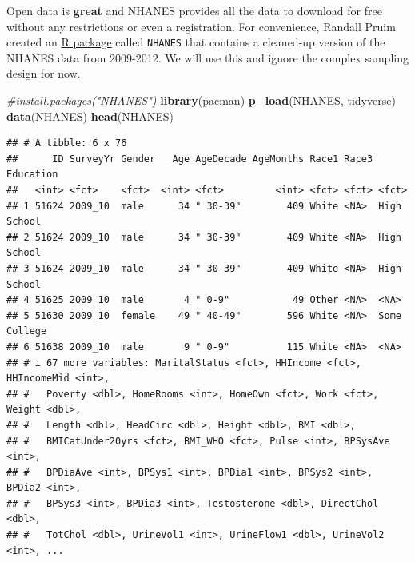 \documentclass[
]{book}
\newenvironment{Shaded}{\begin{snugshade}}{\end{snugshade}}
\newcommand{\CommentTok}[1]{\textcolor[rgb]{0.56,0.35,0.01}{\textit{#1}}}
\newcommand{\FunctionTok}[1]{\textcolor[rgb]{0.13,0.29,0.53}{\textbf{#1}}}
\newcommand{\NormalTok}[1]{#1}
\newcommand{\SpecialCharTok}[1]{\textcolor[rgb]{0.81,0.36,0.00}{\textbf{#1}}}
\begin{document}
Open data is \textbf{great} and NHANES provides all the data to download for free
without any restrictions or even a registration. For convenience, Randall Pruim
created an \href{https://cran.r-project.org/web/packages/NHANES/NHANES.pdf}{R package}
called \texttt{NHANES} that contains a cleaned-up version of the
NHANES data from 2009-2012. We will use this and ignore the complex sampling
design for now.

\begin{Shaded}
\begin{Highlighting}[]
\CommentTok{\#install.packages("NHANES")}
\FunctionTok{library}\NormalTok{(pacman)}
\FunctionTok{p\_load}\NormalTok{(NHANES, tidyverse)}
\FunctionTok{data}\NormalTok{(NHANES)}
\FunctionTok{head}\NormalTok{(NHANES)}
\end{Highlighting}
\end{Shaded}

\begin{verbatim}
## # A tibble: 6 x 76
##      ID SurveyYr Gender   Age AgeDecade AgeMonths Race1 Race3 Education   
##   <int> <fct>    <fct>  <int> <fct>         <int> <fct> <fct> <fct>       
## 1 51624 2009_10  male      34 " 30-39"        409 White <NA>  High School 
## 2 51624 2009_10  male      34 " 30-39"        409 White <NA>  High School 
## 3 51624 2009_10  male      34 " 30-39"        409 White <NA>  High School 
## 4 51625 2009_10  male       4 " 0-9"           49 Other <NA>  <NA>        
## 5 51630 2009_10  female    49 " 40-49"        596 White <NA>  Some College
## 6 51638 2009_10  male       9 " 0-9"          115 White <NA>  <NA>        
## # i 67 more variables: MaritalStatus <fct>, HHIncome <fct>, HHIncomeMid <int>,
## #   Poverty <dbl>, HomeRooms <int>, HomeOwn <fct>, Work <fct>, Weight <dbl>,
## #   Length <dbl>, HeadCirc <dbl>, Height <dbl>, BMI <dbl>,
## #   BMICatUnder20yrs <fct>, BMI_WHO <fct>, Pulse <int>, BPSysAve <int>,
## #   BPDiaAve <int>, BPSys1 <int>, BPDia1 <int>, BPSys2 <int>, BPDia2 <int>,
## #   BPSys3 <int>, BPDia3 <int>, Testosterone <dbl>, DirectChol <dbl>,
## #   TotChol <dbl>, UrineVol1 <int>, UrineFlow1 <dbl>, UrineVol2 <int>, ...
\end{verbatim}

\begin{Shaded}
\end{Shaded}
\end{document}
